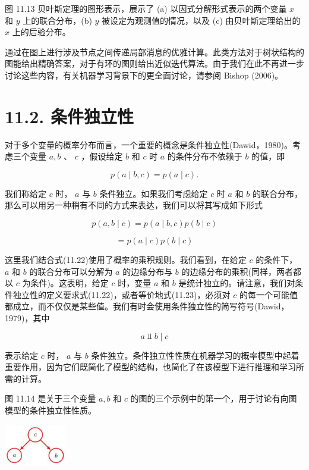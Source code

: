 \documentclass[10pt]{article}
\begin{document}
图 11.13 贝叶斯定理的图形表示，展示了 (a) 以因式分解形式表示的两个变量 \(x\) 和 \(y\) 上的联合分布，(b) \(y\) 被设定为观测值的情况，以及 (c) 由贝叶斯定理给出的 \(x\) 上的后验分布。

通过在图上进行涉及节点之间传递局部消息的优雅计算。此类方法对于树状结构的图能给出精确答案，对于有环的图则给出近似迭代算法。由于我们在此不再进一步讨论这些内容，有关机器学习背景下的更全面讨论，请参阅 Bishop (2006)。

\section*{11.2. 条件独立性}

对于多个变量的概率分布而言，一个重要的概念是条件独立性(Dawid，1980)。考虑三个变量 \(a,b\) 、 \(c\) ，假设给定 \(b\) 和 \(c\) 时 \(a\) 的条件分布不依赖于 \(b\) 的值，即

\[
p\left( {a \mid  b,c}\right)  = p\left( {a \mid  c}\right) . \tag{11.22}
\]

我们称给定 \(c\) 时， \(a\) 与 \(b\) 条件独立。如果我们考虑给定 \(c\) 时 \(a\) 和 \(b\) 的联合分布，那么可以用另一种稍有不同的方式来表达，我们可以将其写成如下形式

\[
p\left( {a,b \mid  c}\right)  = p\left( {a \mid  b,c}\right) p\left( {b \mid  c}\right)
\]

\[
= p\left( {a \mid  c}\right) p\left( {b \mid  c}\right)  \tag{11.23}
\]

这里我们结合式(11.22)使用了概率的乘积规则。我们看到，在给定 \(c\) 的条件下， \(a\) 和 \(b\) 的联合分布可以分解为 \(a\) 的边缘分布与 \(b\) 的边缘分布的乘积(同样，两者都以 \(c\) 为条件)。这表明，给定 \(c\) 时，变量 \(a\) 和 \(b\) 是统计独立的。请注意，我们对条件独立性的定义要求式(11.22)，或者等价地式(11.23)，必须对 \(c\) 的每一个可能值都成立，而不仅仅是某些值。我们有时会使用条件独立性的简写符号(Dawid，1979)，其中

\[
a ⫫ b \mid  c \tag{11.24}
\]

表示给定 \(c\) 时， \(a\) 与 \(b\) 条件独立。条件独立性性质在机器学习的概率模型中起着重要作用，因为它们既简化了模型的结构，也简化了在该模型下进行推理和学习所需的计算。

图 11.14 是关于三个变量 \(a,b\) 和 \(c\) 的图的三个示例中的第一个，用于讨论有向图模型的条件独立性性质。

\begin{center}
\includegraphics[max width=0.2\textwidth]{images/0194e279-9b28-703a-88f4-c3ac21e2010d_357_1287_346_264_180_0.jpg}
\end{center}
\hspace*{3em} 
\end{document}
